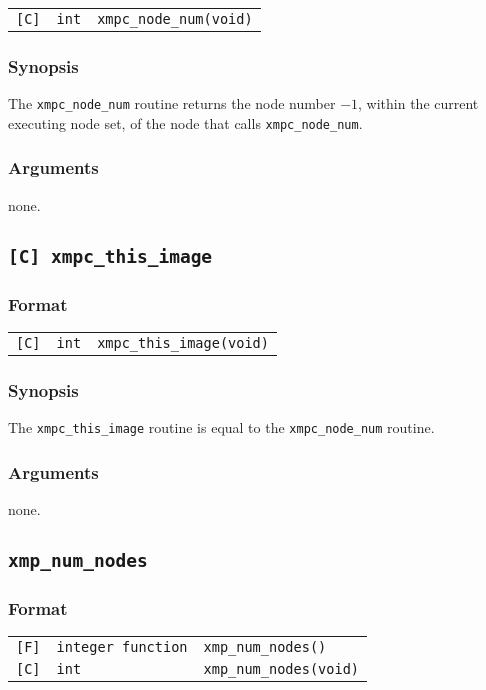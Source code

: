 \begin{tabular}{lll}
\verb![C]!&  {\tt int}& {\tt xmpc\_node\_num(void)}
\end{tabular}

\subsubsection*{Synopsis}
The {\tt xmpc\_node\_num} routine returns the node number $- 1$,
within the current executing node set, of the node that calls {\tt xmpc\_node\_num}.

\subsubsection*{Arguments}
none.

\subsection{\tt [C] xmpc\_this\_image}\label{sub:xmpcthisimage}

\subsubsection*{Format}

\begin{tabular}{lll}
\verb![C]!&  {\tt int}& {\tt xmpc\_this\_image(void)}
\end{tabular}

\subsubsection*{Synopsis}
The {\tt xmpc\_this\_image} routine is equal to the {\tt xmpc\_node\_num} routine.

\subsubsection*{Arguments}
none.

\subsection{\tt xmp\_num\_nodes}

\subsubsection*{Format}

\begin{tabular}{lll}
\verb![F]!&  {\tt integer function}& {\tt xmp\_num\_nodes()}\\
\verb![C]!&  {\tt int}& {\tt xmp\_num\_nodes(void)}
\end{tabular}


